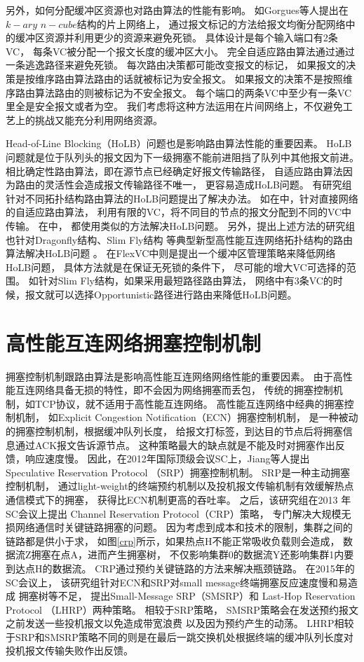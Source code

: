 另外，如何分配缓冲区资源也对路由算法的性能有影响。
如Gorgues等人提出在$k-ary$ $n-cube$结构的片上网络上，
通过报文标记的方法给报文均衡分配网络中的缓冲区资源并利用更少的资源来避免死锁。
具体设计是每个输入端口有2条VC，
每条VC被分配一个报文长度的缓冲区大小。
完全自适应路由算法通过通过一条逃逸路径来避免死锁。
每次路由决策都可能改变报文的标记，
如果报文的决策是按维序路由算法路由的话就被标记为安全报文。
如果报文的决策不是按照维序路由算法路由的则被标记为不安全报文。
每个端口的两条VC中至少有一条VC里全是安全报文或者为空。
我们考虑将这种方法运用在片间网络上，不仅避免工艺上的挑战又能充分利用网络资源。

Head-of-Line Blocking（HoLB）问题也是影响路由算法性能的重要因素。
HoLB问题就是位于队列头的报文因为下一级拥塞不能前进阻挡了队列中其他报文前进。
相比确定性路由算法，即在源节点已经确定好报文传输路径，
自适应路由算法因为路由的灵活性会造成报文传输路径不唯一，
更容易造成HoLB问题。
有研究组针对不同拓扑结构路由算法的HoLB问题提出了解决办法。
如在中，针对直接网络的自适应路由算法，
利用有限的VC，将不同目的节点的报文分配到不同的VC中传输。
在中，
都使用类似的方法解决HoLB问题。
另外，提出上述方法的研究组也针对Dragonfly结构、Slim Fly结构
等典型新型高性能互连网络拓扑结构的路由算法解决HoLB问题
。
在FlexVC中则是提出一个缓冲区管理策略来降低网络HoLB问题，
具体方法就是在保证无死锁的条件下，
尽可能的增大VC可选择的范围。
如针对Slim Fly结构，如果采用最短路径路由算法，
网络中有3条VC的时候，报文就可以选择Opportunistic路径进行路由来降低HoLB问题。

\section{高性能互连网络拥塞控制机制}
拥塞控制机制跟路由算法是影响高性能互连网络网络性能的重要因素。
由于高性能互连网络具备无损的特性，即不会因为网络拥塞而丢包，
传统的拥塞控制机制，如TCP协议，就不适用于高性能互连网络。
高性能互连网络中经典的拥塞控制机制，
如Explicit Congestion Notification（ECN）拥塞控制机制，
是一种被动的拥塞控制机制，根据缓冲队列长度，
给报文打标签，到达目的节点后将拥塞信息通过ACK报文告诉源节点。
这种策略最大的缺点就是不能及时对拥塞作出反馈，响应速度慢。
因此，在2012年国际顶级会议SC上，Jiang等人提出
Speculative Reservation Protocol （SRP）拥塞控制机制。
SRP是一种主动拥塞控制机制，
通过light-weight的终端预约机制以及投机报文传输机制有效缓解热点通信模式下的拥塞，
获得比ECN机制更高的吞吐率。
之后，该研究组在2013 年SC会议上提出
Channel Reservation Protocol（CRP）策略，
专门解决大规模无损网络通信时关键链路拥塞的问题。
因为考虑到成本和技术的限制，集群之间的链路都是供小于求，
如图\ref{crp}所示，如果热点H不能正常吸收负载则会造成，
数据流Z拥塞在点A，进而产生拥塞树，
不仅影响集群0的数据流Y还影响集群1内要到达点H的数据流。
CRP通过预约关键链路的方法来解决瓶颈链路。
在2015年的SC会议上，
该研究组针对ECN和SRP对small message终端拥塞反应速度慢和易造成
拥塞树等不足，
提出Small-Message SRP（SMSRP）和
Last-Hop Reservation Protocol （LHRP）两种策略。
相较于SRP策略，
SMSRP策略会在发送预约报文之前发送一些投机报文以免造成带宽浪费
以及因为预约产生的动荡。
LHRP相较于SRP和SMSRP策略不同的则是在最后一跳交换机处根据终端的缓冲队列长度对
投机报文传输失败作出反馈。


